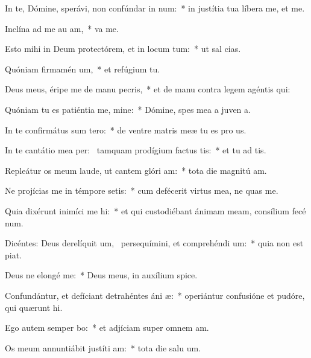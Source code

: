 \item In te, Dómine, sperávi, non confúndar in num:~* in justítia tua líbera me, et  me.
\item Inclína ad me au am,~*  va me.
\item Esto mihi in Deum protectórem, et in locum tum:~* ut sal  cias.
\item Quóniam firmamén um,~* et refúgium   tu.
\item Deus meus, éripe me de manu pecris,~* et de manu contra legem agéntis  qui:
\item Quóniam tu es patiéntia me, mine:~* Dómine, spes mea a juven a.
\item In te confirmátus sum  tero:~* de ventre matris meæ tu es pro us.
\item In te cantátio mea per:~\pscross{} tamquam prodígium factus  tis:~* et tu ad tis.
\item Repleátur os meum laude, ut cantem glóri am:~* tota die magnitú am.
\item Ne projícias me in témpore setis:~* cum defécerit virtus mea, ne quas me.
\item Quia dixérunt inimíci me hi:~* et qui custodiébant ánimam meam, consílium fecé  num.
\item Dicéntes: Deus derelíquit um,~\pscross{} persequímini, et comprehéndi um:~* quia non est  piat.
\item Deus ne elongé  me:~* Deus meus, in auxílium  spice.
\item Confundántur, et defíciant detrahéntes áni æ:~* operiántur confusióne et pudóre, qui quærunt  hi.
\item Ego autem semper bo:~* et adjíciam super omnem  am.
\item Os meum annuntiábit justíti am:~* tota die salu um.
